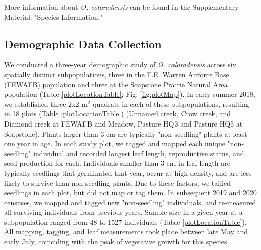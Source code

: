 \documentclass[12pt, letterpaper]{article}
\begin{document}
More information about \textit{O. coloradensis} can be found in the Supplementary Material: "Species Information."

\subsection{Demographic Data Collection}
 We conducted a three-year demographic study of \textit{O. coloradensis} across six spatially distinct subpopulations, three in the F.E. Warren Airforce Base (FEWAFB) population and three at the Soapstone Prairie Natural Area population (Table \ref{plotLocationTable}; Fig. \ref{fig:plotMap}). In early summer 2018, we established three 2\textsf{x}2 m$^2$ quadrats in each of these subpopulations, resulting in 18 plots (Table \ref{plotLocationTable}) (Unnamed creek, Crow creek, and Diamond creek at FEWAFB and Meadow, Pasture HQ3 and Pasture HQ5 at Soapstone). Plants larger than 3 cm are typically "non-seedling" plants at least one year in age. In each study plot, we tagged and mapped each unique "non-seedling" individual and recorded longest leaf length, reproductive status, and seed production for each. Individuals smaller than 3 cm in leaf length are typically seedlings that germinated that year, occur at high density, and are less likely to survive than non-seedling plants. Due to these factors, we tallied seedlings in each plot, but did not map or tag them. In subsequent 2019 and 2020 censuses, we mapped and tagged new "non-seedling" individuals, and re-measured all surviving individuals from previous years. Sample size in a given year at a subpopulation ranged from 48 to 1527 individuals (Table \ref{plotLocationTable}). All mapping, tagging, and leaf measurements took place between late May and early July, coinciding with the peak of vegetative growth for this species. 
\end{document}
